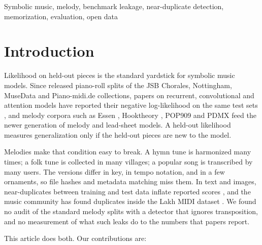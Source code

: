 \documentclass[ProofPDF]{./Styles/Jnls-Template-V3}
\begin{document}
\begin{keyword}[KEYWORDS:]
Symbolic music, melody, benchmark leakage, near-duplicate detection, memorization, evaluation, open data
\end{keyword}

\maketitle

\linenumbers

\section{Introduction}\label{sec:intro}

Likelihood on held-out pieces is the standard yardstick for symbolic music models. Since \cite{boulangerlewandowski2012} released piano-roll splits of the JSB Chorales, Nottingham, MuseData and Piano-midi.de collections, papers on recurrent, convolutional and attention models have reported their negative log-likelihood on the same test sets \citep{huang2017coconet,bai2018tcn,huang2019musictransformer}, and melody corpora such as Essen \citep{schaffrath1995essen}, Hooktheory \citep{donahue2022sheetsage}, POP909 \citep{wang2020pop909} and PDMX \citep{long2025pdmx} feed the newer generation of melody and lead-sheet models. A held-out likelihood measures generalization only if the held-out pieces are new to the model.

Melodies make that condition easy to break. A hymn tune is harmonized many times; a folk tune is collected in many villages; a popular song is transcribed by many users. The versions differ in key, in tempo notation, and in a few ornaments, so file hashes and metadata matching miss them. In text and images, near-duplicates between training and test data inflate reported scores \citep{lee2022dedup,barz2020cifar,allamanis2019duplication,magar2022contamination}, and the music community has found duplicates inside the Lakh MIDI dataset \citep{choi2025lmddedup}. We found no audit of the standard melody splits with a detector that ignores transposition, and no measurement of what such leaks do to the numbers that papers report.

This article does both. Our contributions are:
\end{document}
